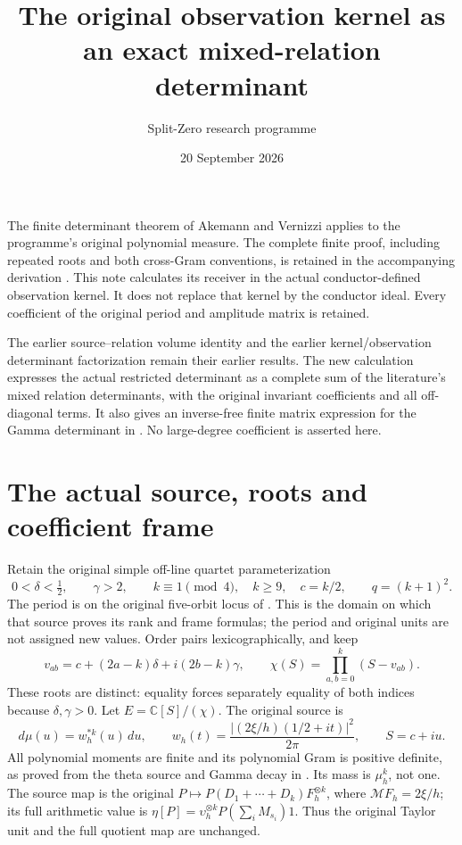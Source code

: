 \documentclass[11pt]{article}
\title{The original observation kernel as an exact mixed-relation determinant}
\author{Split-Zero research programme}
\date{20 September 2026}
\newcommand{\C}{\mathbb C}
\begin{document}
\maketitle

The finite determinant theorem of Akemann and Vernizzi
\cite[\texttt{Th}, \texttt{Ddef}, \texttt{deg}]{AV} applies to the
programme's original polynomial measure. The complete finite proof,
including repeated roots and both cross-Gram conventions, is retained
in the accompanying derivation \cite{Mixed}. This note calculates its
receiver in the actual conductor-defined observation kernel. It does
not replace that kernel by the conductor ideal. Every coefficient of
the original period and amplitude matrix is retained.

The earlier source--relation volume identity \cite[(11)--(16)]{Toda}
and the earlier kernel/observation determinant factorization
\cite[FW37--40]{FW} remain their earlier results. The new calculation
expresses the actual restricted determinant as a complete sum of the
literature's mixed relation determinants, with the original invariant
coefficients and all off-diagonal terms. It also gives an inverse-free
finite matrix expression for the Gamma determinant in
\cite[JM21--28]{JM}. No large-degree coefficient is asserted here.

\section{The actual source, roots and coefficient frame}
Retain the original simple off-line quartet parameterization
\[
 0<\delta<\tfrac12,\qquad \gamma>2,\qquad
 k\equiv1\pmod4,\quad k\ge9,\quad c=k/2,
 \qquad q=(k+1)^2.
 \tag{MR1}
\]
The period is on the original five-orbit locus of \cite{OCF}.
This is the domain on which that source proves its rank and frame
formulas; the period and original units are not assigned new values.
Order pairs lexicographically, and keep
\[
 v_{ab}=c+(2a-k)\delta+i(2b-k)\gamma,
 \qquad \chi(S)=\prod_{a,b=0}^k(S-v_{ab}).\tag{MR2}
\]
These roots are distinct: equality forces separately equality of both
indices because $\delta,\gamma>0$. Let $E=\C[S]/(\chi)$.
The original source is
\[
 d\mu(u)=w_h^{*k}(u)\,du,\qquad
 w_h(t)=\frac{|(2\xi/h)(1/2+it)|^2}{2\pi},\qquad S=c+iu.
 \tag{MR3}
\]
All polynomial moments are finite and its polynomial Gram is positive
definite, as proved from the theta source and Gamma decay in
\cite{Toda,Mixed}. Its mass is $\mu_h^k$, not one.
The source map is the original
$P\mapsto P(D_1+\cdots+D_k)F_h^{\otimes k}$, where
$\mathcal MF_h=2\xi/h$; its full arithmetic value is
$\eta[P]=\upsilon_h^{\otimes k}P(\sum_iM_{s_i})1$.
Thus the original Taylor unit and the full quotient map are unchanged.
\end{document}

